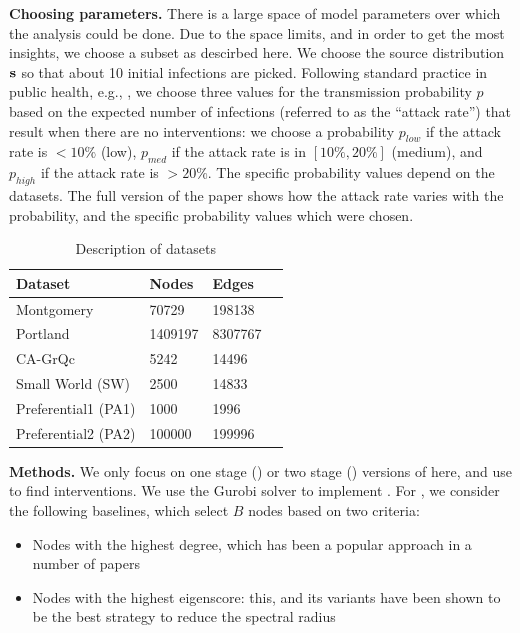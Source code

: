 \noindent
\textbf{Choosing parameters.}
There is a large space of model parameters over which the analysis could be done. Due to the space limits, and
in order to get the most insights, we choose a subset as descirbed here.
We choose the source distribution $\mathbf{s}$ so that about 10 initial infections are picked.
Following standard practice in public health, e.g., \cite{halloran:pnas08},
we choose three values for the transmission probability $p$ based on the expected number of infections (referred to as the ``attack rate'') 
that result when there are no interventions: we choose a probability $p_{low}$ if the attack rate is $<10\%$ (low),
$p_{med}$ if the attack rate is in $[10\%, 20\%]$ (medium), and
$p_{high}$ if the attack rate is $> 20\%$.
The specific probability values depend on the datasets.
The full version of the paper \cite{fullversion} shows how the attack rate varies with the probability, and the specific probability values which were chosen.

\begin{table}[!h]
\centering
\begin{tabular}{llll}
\hline
 \textbf{Dataset} & \textbf{Nodes} & \textbf{Edges}   \\ \hline
 Montgomery & 70729 & 198138 \\
 Portland & 1409197 & 8307767 \\
 CA-GrQc & 5242 & 14496\\
 Small World (SW) & 2500 & 14833 \\   
 Preferential1 (PA1) & 1000 & 1996 \\ 
Preferential2 (PA2) & 100000 & 199996 \\ \hline
\end{tabular}
\caption{Description of datasets}
\label{tab:datasets}
\end{table}

\noindent
\textbf{Methods.}
We only focus on one stage (\probone) or two stage (\probtwo) versions of \prob{} here, and use \algo{} to find 
interventions. We use the Gurobi solver \cite{gurobi} to implement \algo{}.
For \probone{}, we consider the following baselines, which select $B$ nodes based on two criteria:
\begin{itemize}
\item
Nodes with the highest degree, which has been a popular approach in a number of papers
\cite{salathe:plos12, Barabasi509}
\item
Nodes with the highest eigenscore: this, and its variants have been shown to be the best strategy to reduce the spectral radius
\cite{tong:cikm12,zhang2015controlling,YaoSDM2014,AAAI1816714,PreciadoVM13_2,PreciadoVM13,PreciadoVM14}
\end{itemize}

